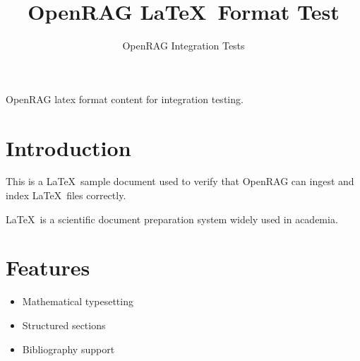 \documentclass{article}
\title{OpenRAG \LaTeX\ Format Test}
\author{OpenRAG Integration Tests}
\begin{document}
\maketitle

OpenRAG latex format content for integration testing.

\section{Introduction}

This is a \LaTeX\ sample document used to verify that OpenRAG can ingest and index \LaTeX\ files correctly.

\LaTeX\ is a scientific document preparation system widely used in academia.

\section{Features}

\begin{itemize}
  \item Mathematical typesetting
  \item Structured sections
  \item Bibliography support
\end{itemize}
\end{document}

